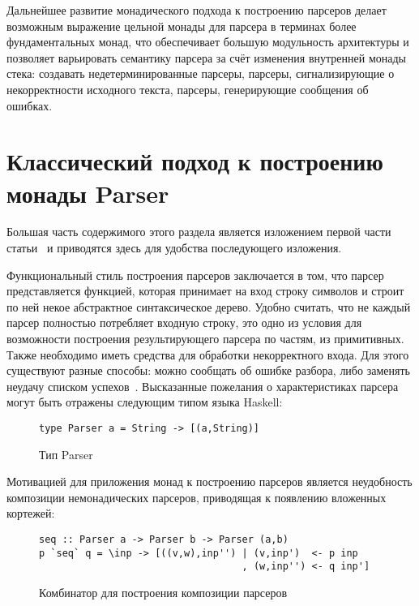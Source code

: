 Дальнейшее развитие монадического подхода к построению парсеров делает возможным
выражение цельной монады для парсера в терминах более фундаментальных монад, что
обеспечивает большую модульность архитектуры и позволяет варьировать семантику
парсера за счёт изменения внутренней монады стека: создавать недетерминированные
парсеры, парсеры, сигнализирующие о некорректности исходного текста, парсеры,
генерирующие сообщения об ошибках.

\section{Классический подход к построению монады Parser}

Большая часть содержимого этого раздела является изложением первой части
статьи~\cite{monParsing} и приводятся здесь для удобства последующего изложения.

Функциональный стиль построения парсеров заключается в том, что парсер
представляется функцией, которая принимает на вход строку символов и строит
по ней некое абстрактное синтаксическое дерево. Удобно считать, что не каждый 
парсер полностью потребляет входную строку, это одно из условия для возможности 
построения результирующего парсера по частям, из примитивных. Также необходимо 
иметь средства для обработки некорректного входа. Для этого существуют разные 
способы: можно сообщать об ошибке разбора, либо заменять неудачу списком 
успехов~\cite{wadlerSuccess}. Высказанные пожелания о характеристиках 
парсера могут быть отражены следующим типом языка Haskell:

\begin{figure}[h]
\begin{lstlisting}
type Parser a = String -> [(a,String)]
\end{lstlisting}
\caption{Тип Parser}
\end{figure}

Мотивацией для приложения монад к построению парсеров является неудобность 
композиции немонадических парсеров, приводящая к появлению вложенных кортежей:

\begin{figure}[h]
\begin{lstlisting}
seq :: Parser a -> Parser b -> Parser (a,b)
p `seq` q = \inp -> [((v,w),inp'') | (v,inp')  <- p inp
                                   , (w,inp'') <- q inp']
\end{lstlisting}
\caption{Комбинатор для построения композиции парсеров}
\end{figure}

